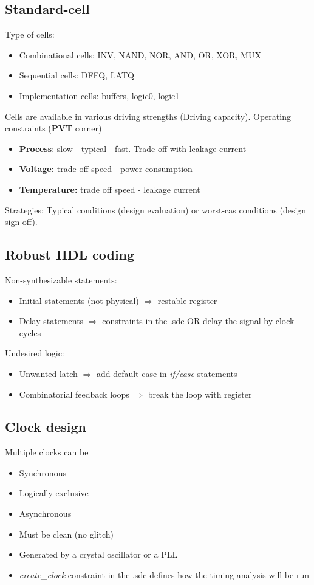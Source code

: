   \subsection{Standard-cell}
  
  Type of cells:
  \begin{itemize}
  \item Combinational cells: INV, NAND, NOR, AND, OR, XOR, MUX
  \item Sequential cells: DFFQ, LATQ
  \item Implementation cells: buffers, logic0, logic1
  \end{itemize}

  Cells are available in various driving strengths (Driving capacity).
\bigbreak
Operating constraints (\textbf{PVT} corner)
\begin{itemize}
  \item \textbf{Process}: slow - typical - fast. Trade off with leakage current
  \item \textbf{Voltage:} trade off speed - power consumption
  \item \textbf{Temperature:} trade off speed - leakage current
\end{itemize}
Strategies: Typical conditions (design evaluation) or worst-cas conditions (design sign-off).

\subsection{Robust HDL coding}
Non-synthesizable statements:
\begin{itemize}
  \item Initial statements (not physical) \(\Rightarrow\) restable register
  \item Delay statements \(\Rightarrow\) constraints in the .sdc OR delay the signal by clock cycles
\end{itemize}

Undesired logic:
\begin{itemize}
  \item Unwanted latch \(\Rightarrow\) add default case in \textit{if/case} statements
  \item Combinatorial feedback loops \(\Rightarrow\) break the loop with register
\end{itemize}


\subsection{Clock design}
Multiple clocks can be
\begin{itemize}
  \item Synchronous
  \item Logically exclusive 
  \item Asynchronous
\end{itemize}
\bigbreak
\begin{itemize}
  \item Must be clean (no glitch)
  \item Generated by a crystal oscillator or a PLL
  \item \textit{create\_clock} constraint in the .sdc defines how the timing analysis will be run
\end{itemize}


